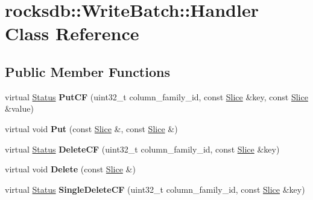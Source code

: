 \hypertarget{classrocksdb_1_1WriteBatch_1_1Handler}{}\section{rocksdb\+:\+:Write\+Batch\+:\+:Handler Class Reference}
\label{classrocksdb_1_1WriteBatch_1_1Handler}
\subsection*{Public Member Functions}
\begin{DoxyCompactItemize}
\item 
virtual \hyperlink{classrocksdb_1_1Status}{Status} {\bfseries Put\+CF} (uint32\+\_\+t column\+\_\+family\+\_\+id, const \hyperlink{classrocksdb_1_1Slice}{Slice} \&key, const \hyperlink{classrocksdb_1_1Slice}{Slice} \&value)\hypertarget{classrocksdb_1_1WriteBatch_1_1Handler_a17e17f57d3d614483b3d849468db108a}{}\label{classrocksdb_1_1WriteBatch_1_1Handler_a17e17f57d3d614483b3d849468db108a}

\item 
virtual void {\bfseries Put} (const \hyperlink{classrocksdb_1_1Slice}{Slice} \&, const \hyperlink{classrocksdb_1_1Slice}{Slice} \&)\hypertarget{classrocksdb_1_1WriteBatch_1_1Handler_accf33beb9e1587846826c243302a0cdc}{}\label{classrocksdb_1_1WriteBatch_1_1Handler_accf33beb9e1587846826c243302a0cdc}

\item 
virtual \hyperlink{classrocksdb_1_1Status}{Status} {\bfseries Delete\+CF} (uint32\+\_\+t column\+\_\+family\+\_\+id, const \hyperlink{classrocksdb_1_1Slice}{Slice} \&key)\hypertarget{classrocksdb_1_1WriteBatch_1_1Handler_a055858a9b7c0479d15d909d4f1f6c125}{}\label{classrocksdb_1_1WriteBatch_1_1Handler_a055858a9b7c0479d15d909d4f1f6c125}

\item 
virtual void {\bfseries Delete} (const \hyperlink{classrocksdb_1_1Slice}{Slice} \&)\hypertarget{classrocksdb_1_1WriteBatch_1_1Handler_aa32531e83a34a1dd9da2a0e4bfb26e1e}{}\label{classrocksdb_1_1WriteBatch_1_1Handler_aa32531e83a34a1dd9da2a0e4bfb26e1e}

\item 
virtual \hyperlink{classrocksdb_1_1Status}{Status} {\bfseries Single\+Delete\+CF} (uint32\+\_\+t column\+\_\+family\+\_\+id, const \hyperlink{classrocksdb_1_1Slice}{Slice} \&key)\hypertarget{classrocksdb_1_1WriteBatch_1_1Handler_a48386b0c5115f5097bd72fe163b8611d}{}\label{classrocksdb_1_1WriteBatch_1_1Handler_a48386b0c5115f5097bd72fe163b8611d}


\end{DoxyCompactItemize}
